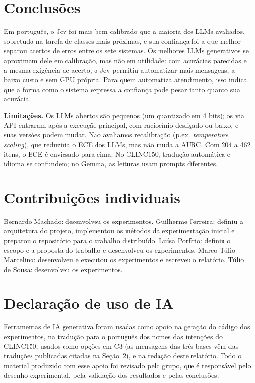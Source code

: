 \documentclass[sigconf,nonacm]{acmart}
\begin{document}
\section{Conclusões}
Em português, o Jev foi mais bem calibrado que a maioria dos LLMs avaliados, sobretudo na tarefa de classes mais próximas, e sua confiança foi a que melhor separou acertos de erros entre os sete sistemas. Os melhores LLMs generativos se aproximam dele em calibração, mas não em utilidade: com acurácias parecidas e a mesma exigência de acerto, o Jev permitiu automatizar mais mensagens, a baixo custo e sem GPU própria. Para quem automatiza atendimento, isso indica que a forma como o sistema expressa a confiança pode pesar tanto quanto sua acurácia.

\textbf{Limitações.} Os LLMs abertos são pequenos (um quantizado em 4 bits); os via API entraram após a execução principal, com raciocínio desligado ou baixo, e suas versões podem mudar. Não avaliamos recalibração (p.ex.\ \emph{temperature scaling}), que reduziria o ECE dos LLMs, mas não muda a AURC. Com 204 a 462 itens, o ECE é enviesado para cima. No CLINC150, tradução automática e idioma se confundem; no Gemma, as leituras usam prompts diferentes.\label{fimcorpo}

\section*{Contribuições individuais}
Bernardo Machado: desenvolveu os experimentos. Guilherme Ferreira: definiu a arquitetura do projeto, implementou os métodos da experimentação inicial e preparou o repositório para o trabalho distribuído. Luísa Porfírio: definiu o escopo e a proposta do trabalho e desenvolveu os experimentos. Marco Túlio Marcelino: desenvolveu e executou os experimentos e escreveu o relatório. Túlio de Sousa: desenvolveu os experimentos.

\section*{Declaração de uso de IA}
Ferramentas de IA generativa foram usadas como apoio na geração do código dos experimentos, na tradução para o português dos nomes das intenções do CLINC150, usados como opções em C3 (as mensagens das três bases vêm das traduções publicadas citadas na Seção~2), e na redação deste relatório. Todo o material produzido com esse apoio foi revisado pelo grupo, que é responsável pelo desenho experimental, pela validação dos resultados e pelas conclusões.



\end{document}
